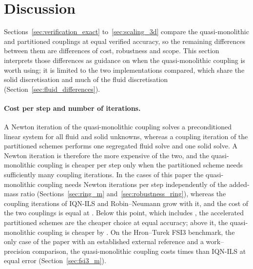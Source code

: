 \section{Discussion}\label{sec:discussion}


Sections~\ref{sec:verification_exact} to~\ref{sec:scaling_3d} compare the quasi-monolithic and partitioned couplings at equal verified accuracy, so the remaining differences between them are differences of cost, robustness and scope.
This section interprets those differences as guidance on when the quasi-monolithic coupling is worth using; it is limited to the two implementations compared, which share the solid discretisation and much of the fluid discretisation (Section~\ref{sec:fluid_differences}).

\paragraph{Cost per step and number of iterations.}
A Newton iteration of the quasi-monolithic coupling solves a preconditioned linear system for all fluid and solid unknowns, whereas a coupling iteration of the partitioned schemes performs one segregated fluid solve and one solid solve.
A Newton iteration is therefore the more expensive of the two, and the quasi-monolithic coupling is cheaper per step only when the partitioned scheme needs sufficiently many coupling iterations.
In the cases of this paper the quasi-monolithic coupling needs  Newton iterations per step independently of the added-mass ratio (Sections~\ref{sec:ring_m} and~\ref{sec:robustness_ring}), whereas the coupling iterations of IQN-ILS and Robin--Neumann grow with it, and the cost of the two couplings is equal at .
Below this point, which includes , the accelerated partitioned schemes are the cheaper choice at equal accuracy; above it, the quasi-monolithic coupling is cheaper by .
On the Hron--Turek FSI3 benchmark, the only case of the paper with an established external reference and a work--precision comparison, the quasi-monolithic coupling costs  times  than IQN-ILS at equal error (Section~\ref{sec:fsi3_m}).

